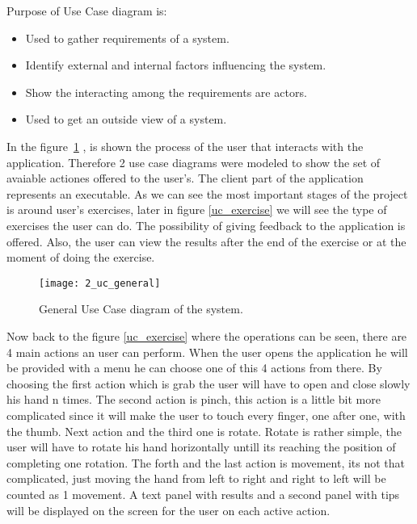 Purpose of Use Case diagram is:

\begin{itemize}
\item Used to gather requirements of a system.
\item Identify external and internal factors influencing the system.
\item Show the interacting among the requirements are actors.
\item Used to get an outside view of a system.

\end{itemize}
\vspace{0.2cm}


In the \mbox{figure \ref{uc_general}} , is shown the process of the user that interacts with the application. Therefore 2 use case diagrams were modeled to show the set of avaiable actiones offered to the user's. The client part of the application represents an executable. As we can see the most important stages of the project is around  user's exercises, later in \mbox{figure} \ref{uc_exercise} we will see the type of exercises the user can do. The possibility of giving feedback to the application is offered. Also, the user can view the results after the end of the exercise or at the moment of doing the exercise.


\begin{figure}[!h]
\centering
\texttt{[image: 2\_uc\_general]}
\caption{General Use Case diagram of the system.}\label{uc_general}
\end{figure}

Now back to the \mbox{figure} \ref{uc_exercise} where the operations can be seen, there are 4 main actions an user can perform. When the user opens the application he will be provided with a menu he can choose one of this 4 actions from there. By choosing the first action which is grab the user will have to open and close slowly his hand n times. The second action is pinch, this action is a little bit more complicated since it will make the user to touch every finger, one after one, with the thumb. Next action and the third one is rotate. Rotate is rather simple, the user will have to rotate his hand horizontally untill its reaching the position of completing one rotation. The forth and the last action is movement, its not that complicated, just moving the hand from left to right and right to left will be counted as 1 movement. A text panel with results and a second panel with tips will be displayed on the screen for the user on each active action.


